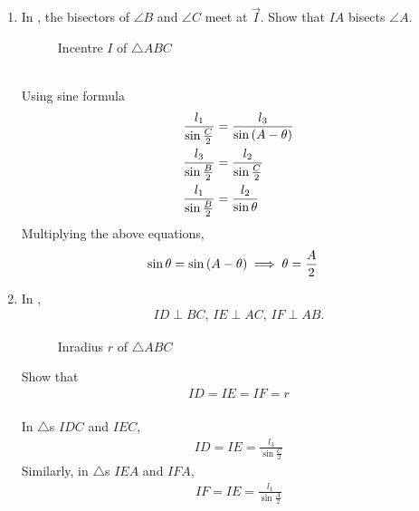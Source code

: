 
\begin{enumerate}[label=\thesection.\arabic*.,ref=\thesection.\theenumi]
\item  In  
	, the bisectors of $\angle B$ and $\angle C$	 meet at $\vec{I}$.
Show that $IA$ bisects $\angle A$.
\begin{figure}[!ht]
	\begin{center}
		
		\resizebox{\columnwidth}{!}{}
	\end{center}
	\caption{Incentre $I$ of $\triangle ABC$}
	\label{fig:tri_icentre}	
\end{figure}
\\
\solution
Using sine formula
  \begin{align}
  \frac{l_1}{\sin\frac{C}{2}}
  &= 
   \frac{l_3}{\sin \left(A-\theta\right)}
  \\
   \frac{l_3}{\sin\frac{B}{2}}
&=\frac{l_2}{\sin\frac{C}{2}}
  \\
  \frac{l_1}{\sin\frac{B}{2}}
	  &=\frac{l_2}{\sin \theta}
  \end{align}
  Multiplying the above equations, 
  \begin{align}
  \sin \theta &= \sin \left(A - \theta\right)
  \implies \theta = \frac{A}{2}
  \end{align}
  \item In
	, 
  \begin{align}
	  ID \perp BC, \, 
	  IE \perp AC, \, 
	  IF \perp AB.
  \end{align}
		\begin{figure}[!ht]
	\begin{center}
		\resizebox{\columnwidth}{!}{}
	\end{center}
	\caption{Inradius $r$ of $\triangle ABC$}
	\label{fig:tri_iradius}	
\end{figure}
  Show that 
  \begin{align}
	  ID=   
	  IE= 
	  IF=r 
	\label{eq:tri_iradius}	
  \end{align}
  \\
		\solution
In $\triangle$s $IDC$ and $IEC$, 
		\begin{align}
ID = IE=  \frac{l_3}{\sin\frac{C}{2}}
		\end{align}
		Similarly, 
in $\triangle$s $IEA$ and $IFA$, 
		\begin{align}
IF = IE=  \frac{l_1}{\sin\frac{A}{2}}
		\end{align}

\end{enumerate}
